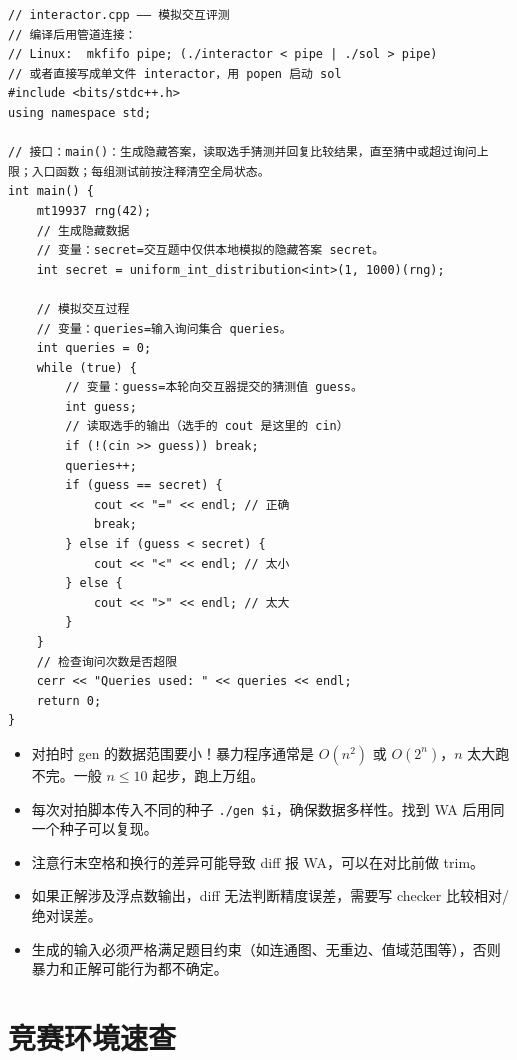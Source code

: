 \documentclass[UTF8,openany,oneside,zihao=-4]{ctexbook}
\begin{document}
\begin{lstlisting}
// interactor.cpp —— 模拟交互评测
// 编译后用管道连接：
// Linux:  mkfifo pipe; (./interactor < pipe | ./sol > pipe)
// 或者直接写成单文件 interactor，用 popen 启动 sol
#include <bits/stdc++.h>
using namespace std;

// 接口：main()：生成隐藏答案，读取选手猜测并回复比较结果，直至猜中或超过询问上限；入口函数；每组测试前按注释清空全局状态。
int main() {
    mt19937 rng(42);
    // 生成隐藏数据
    // 变量：secret=交互题中仅供本地模拟的隐藏答案 secret。
    int secret = uniform_int_distribution<int>(1, 1000)(rng);

    // 模拟交互过程
    // 变量：queries=输入询问集合 queries。
    int queries = 0;
    while (true) {
        // 变量：guess=本轮向交互器提交的猜测值 guess。
        int guess;
        // 读取选手的输出（选手的 cout 是这里的 cin）
        if (!(cin >> guess)) break;
        queries++;
        if (guess == secret) {
            cout << "=" << endl; // 正确
            break;
        } else if (guess < secret) {
            cout << "<" << endl; // 太小
        } else {
            cout << ">" << endl; // 太大
        }
    }
    // 检查询问次数是否超限
    cerr << "Queries used: " << queries << endl;
    return 0;
}
\end{lstlisting}

\begin{warn}
\begin{itemize}
  \item 对拍时 gen 的数据范围要小！暴力程序通常是 $O(n^2)$ 或 $O(2^n)$，$n$ 太大跑不完。一般 $n \le 10$ 起步，跑上万组。
  \item 每次对拍脚本传入不同的种子 \lstinline|./gen $i|，确保数据多样性。找到 WA 后用同一个种子可以复现。
  \item 注意行末空格和换行的差异可能导致 diff 报 WA，可以在对比前做 trim。
  \item 如果正解涉及浮点数输出，diff 无法判断精度误差，需要写 checker 比较相对/绝对误差。
  \item 生成的输入必须严格满足题目约束（如连通图、无重边、值域范围等），否则暴力和正解可能行为都不确定。
\end{itemize}
\end{warn}

\chapter{竞赛环境速查}
\end{document}
